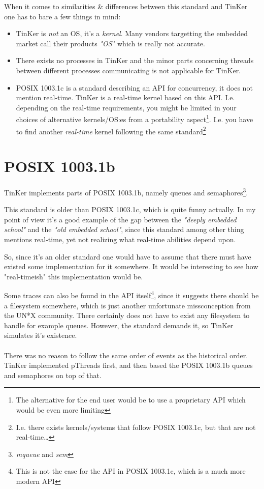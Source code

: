 When it comes to similarities \& differences between this standard and TinKer one has to bare a few things in mind:
\begin{itemize}
	\item TinKer is \textit{not} an OS, it's a \textit{kernel}. Many vendors targetting the embedded market call their products \textit{"OS"} which is really not accurate.
	\item There exists no processes in TinKer and the minor parts concerning threads between different processes communicating is not applicable for TinKer.
	\item POSIX 1003.1c is a standard describing an API for concurrency, it does not mention real-time. TinKer is a real-time kernel based on this API. I.e. depending on the real-time requirements, you might be limited in your choices of alternative kernels/OS:es from a portability aspect\footnote{The alternative for the end user would be to use a proprietary API which would be even more limiting}. I.e. you have to find another \textit{real-time} kernel following the same standard\footnote{I.e. there exists kernels/systems that follow POSIX 1003.1c, but that are not real-time\ldots} 
\end{itemize}
\section{POSIX 1003.1b}
TinKer implements parts of POSIX 1003.1b, namely queues and semaphores\footnote{\textit{mqueue} and \textit{sem}}.

This standard is older than POSIX 1003.1c, which is quite funny actually. In my point of view it's a good example of the gap between the \textit{"deeply embedded school"} and the \textit{"old embedded school"}, since this standard among other thing mentions real-time, yet not realizing what real-time abilities depend upon.

So, since it's an older standard one would have to assume that there must have existed some implementation for it somewhere. It would be interesting to see how "real-timeish" this implementation would be.

Some traces can also be found in the API itself\footnote{This is not the case for the API in POSIX 1003.1c, which is a much more modern API}, since it suggests there should be a filesystem somewhere, which is just another unfortunate missconception from the UN*X community. There certainly does not have to exist any filesystem to handle for example queues. However, the standard demands it, so TinKer simulates it's existence.
\\\\
There was no reason to follow the same order of events as the historical order. TinKer implemented pThreads first, and then based the POSIX 1003.1b queues and semaphores on top of that.

